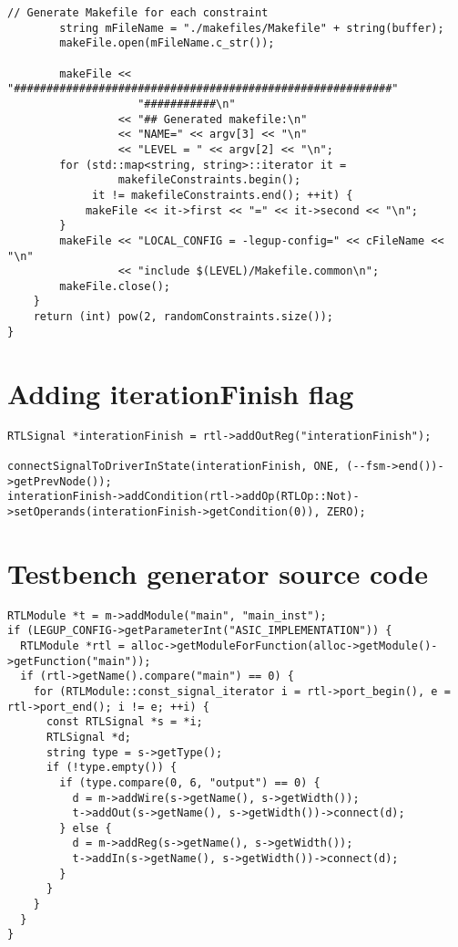 \begin{lstlisting}[caption={Constraint-generation program source code},label=lst:constraintGenerating]
        // Generate Makefile for each constraint
        string mFileName = "./makefiles/Makefile" + string(buffer);
        makeFile.open(mFileName.c_str());

        makeFile << "##########################################################"
                    "###########\n"
                 << "## Generated makefile:\n"
                 << "NAME=" << argv[3] << "\n"
                 << "LEVEL = " << argv[2] << "\n";
        for (std::map<string, string>::iterator it =
                 makefileConstraints.begin();
             it != makefileConstraints.end(); ++it) {
            makeFile << it->first << "=" << it->second << "\n";
        }
        makeFile << "LOCAL_CONFIG = -legup-config=" << cFileName << "\n"
                 << "include $(LEVEL)/Makefile.common\n";
        makeFile.close();
    }
    return (int) pow(2, randomConstraints.size());
}
\end{lstlisting}

\section{\label{sec:iterationfinishsourcecode}Adding iterationFinish flag}
\begin{lstlisting}
RTLSignal *interationFinish = rtl->addOutReg("interationFinish");

connectSignalToDriverInState(interationFinish, ONE, (--fsm->end())->getPrevNode());
interationFinish->addCondition(rtl->addOp(RTLOp::Not)->setOperands(interationFinish->getCondition(0)), ZERO);
\end{lstlisting}

\section{\label{sec:tbgenerationsourcecode}Testbench generator source code}
\begin{lstlisting}
RTLModule *t = m->addModule("main", "main_inst");
if (LEGUP_CONFIG->getParameterInt("ASIC_IMPLEMENTATION")) {
  RTLModule *rtl = alloc->getModuleForFunction(alloc->getModule()->getFunction("main"));
  if (rtl->getName().compare("main") == 0) {
    for (RTLModule::const_signal_iterator i = rtl->port_begin(), e = rtl->port_end(); i != e; ++i) {
      const RTLSignal *s = *i;
      RTLSignal *d;
      string type = s->getType();
      if (!type.empty()) {
        if (type.compare(0, 6, "output") == 0) {
          d = m->addWire(s->getName(), s->getWidth());
          t->addOut(s->getName(), s->getWidth())->connect(d);
        } else {
          d = m->addReg(s->getName(), s->getWidth());
          t->addIn(s->getName(), s->getWidth())->connect(d);
        }
      }
    }
  }
}
\end{lstlisting}